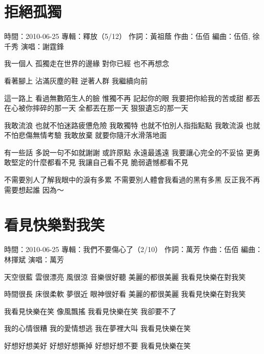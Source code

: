 \documentclass[UTF8,a4paper,oneside,twocolumn,12pt]{ctexbook}
\newcommand{\infopair}[2]{\textbullet #1：#2}
\newcommand{\zc}[1][伍佰]{\infopair{作詞}{#1}}
\newcommand{\zq}[1][伍佰]{\infopair{作曲}{#1}}
\newcommand{\bq}[1][伍佰]{\infopair{編曲}{#1}}
\newcommand{\zj}[1]{\infopair{專輯}{#1}}
\newcommand{\sj}[1]{\infopair{時間}{#1}}
\newenvironment{info}{\begin{flushleft}\kaishu
	}
	{\end{flushleft}\normalsize\yahei\par}
\newenvironment{lyric}{
	}
{}
\begin{document}
\section{拒絕孤獨}
\begin{info}
	\sj{2010-06-25}
	\zj{釋放（5/12）}
	\zc[黃祖蔭]
	\zq
	\bq[伍佰, 徐千秀]
	\infopair{演唱}{謝霆鋒}
\end{info}
\begin{lyric}
	我一個人 孤獨走在世界的邊緣
	對你已經 也不再想念

	看著腳上 沾滿灰塵的鞋
	逆著人群 我繼續向前

	這一路上 看過無數陌生人的臉
	惟獨不再 記起你的眼
	我要把你給我的苦或甜
	都丟在心被你摔碎的那一天
	全都丟在那一天 狠狠遺忘的那一天

	我敢流浪 也就不怕迷路疲憊危險
	我敢獨特 也就不怕別人指指點點
	我敢流淚 也就不怕悲傷無情考驗
	我敢放棄 就要你隨汗水滑落地面

	有一些話 多說一句不如就謝謝
	或許原點 永遠最遙遠
	我要讓心完全的不妥協
	更勇敢堅定的什麼都看不見
	我讓自己看不見 脆弱遺憾都看不見

	不需要別人了解我眼中的淚有多累
	不需要別人體會我看過的黑有多黑
	反正我不再需要想起誰 因為～
\end{lyric}

\section{看見快樂對我笑}
\begin{info}
	\sj{2010-06-25}
	\zj{我們不要傷心了（2/10）}
	\zc[萬芳]
	\zq
	\bq[林揮斌]
	\infopair{演唱}{萬芳}
\end{info}
\begin{lyric}
	天空很藍    雲很漂亮
	風很涼    音樂很好聽
	美麗的都很美麗
	我看見快樂在對我笑

	時間很長    床很柔軟
	夢很近    眼神很好看
	美麗的都很美麗
	我看見快樂在對我笑

	我看見快樂在笑
	像風飄搖
	我看見快樂在笑
	我卻要不了

	我的心情很糟  我的愛情想逃
	我在夢裡大叫  我看見快樂在笑

	好想好想美好  好想好想撕掉
	好想好想不要  我看見快樂在笑
\end{lyric}
\end{document}

